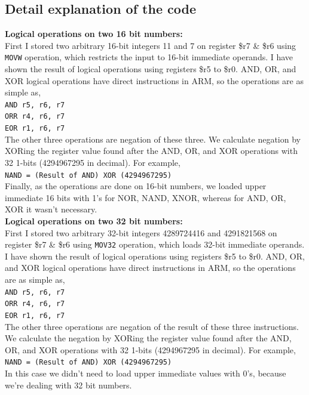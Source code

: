 \documentclass[footheight=20pt, footsepline, headheight=20pt, headsepline]{scrartcl}
\begin{document}
\subsection*{Detail explanation of the code}
\textbf{Logical operations on two 16 bit numbers:}\\
First I stored two arbitrary 16-bit integers 11 and 7 on register \$r7 \& \$r6 using \verb |MOVW| operation, which restricts the input to 16-bit immediate operands. I have shown the result of logical operations using registers \$r5 to \$r0. AND, OR, and XOR logical operations have direct instructions in ARM, so the operations are as simple as,\\
\verb |AND r5, r6, r7|\\
\verb|ORR r4, r6, r7|\\
\verb|EOR r1, r6, r7|\\
The other three operations are negation of these three. We calculate negation by XORing the register value found after the AND, OR, and XOR operations with 32 1-bits (4294967295 in decimal). For example, \\
\verb|NAND = (Result of AND) XOR (4294967295)|\\
Finally, as the operations are done on 16-bit numbers, we loaded upper immediate 16 bits with 1's for NOR, NAND, XNOR, whereas for AND, OR, XOR it wasn't necessary.\\
\textbf{Logical operations on two 32 bit numbers:}\\
First I stored two arbitrary 32-bit integers 4289724416 and 4291821568 on register \$r7 \& \$r6 using \verb |MOV32| operation, which loads 32-bit immediate operands. I have shown the result of logical operations using registers \$r5 to \$r0. AND, OR, and XOR logical operations have direct instructions in ARM, so the operations are as simple as,\\
\verb |AND r5, r6, r7|\\
\verb|ORR r4, r6, r7|\\
\verb|EOR r1, r6, r7|\\
The other three operations are negation of the result of these three instructions. We calculate the negation by XORing the register value found after the AND, OR, and XOR operations with 32 1-bits (4294967295 in decimal). For example, \\
\verb|NAND = (Result of AND) XOR (4294967295)|\\
In this case we didn't need to load upper immediate values with 0's, because we're dealing with 32 bit numbers.
\end{document}
